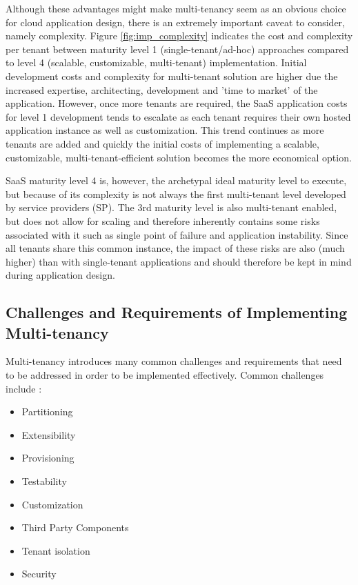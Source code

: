 Although these advantages might make multi-tenancy seem as an obvious choice for cloud application design, there is an extremely important caveat to consider, namely complexity. Figure \ref{fig:imp_complexity} indicates the cost and complexity per tenant between maturity level 1 (single-tenant/ad-hoc) approaches compared to level 4 (scalable, customizable, multi-tenant) implementation. Initial development costs and complexity for multi-tenant solution are higher due the increased expertise, architecting, development and 'time to market' of the application. However, once more tenants are required, the SaaS application costs for level 1 development tends to escalate as each tenant requires their own hosted application instance as well as customization. This trend continues as more tenants are added and quickly the initial costs of implementing a scalable, customizable, multi-tenant-efficient solution becomes the more economical option.



SaaS maturity level 4 is, however, the archetypal ideal maturity level to execute, but because of its complexity is not always the first multi-tenant level developed by service providers (SP). The 3rd maturity level is also multi-tenant enabled, but does not allow for scaling and therefore inherently contains some risks associated with it such as single point of failure and application instability. Since all tenants share this common instance, the impact of these risks are also (much higher) than with single-tenant applications and should therefore be kept in mind during application design.

\subsection{Challenges and Requirements of Implementing Multi-tenancy}

Multi-tenancy introduces many common challenges and requirements that need to be addressed in order to be implemented effectively. Common challenges include \cite{Betts2012-ad}:

\begin{itemize}
\item Partitioning
\item Extensibility
\item Provisioning
\item Testability
\item Customization
\item Third Party Components
\item Tenant isolation
\item Security
\end{itemize}

